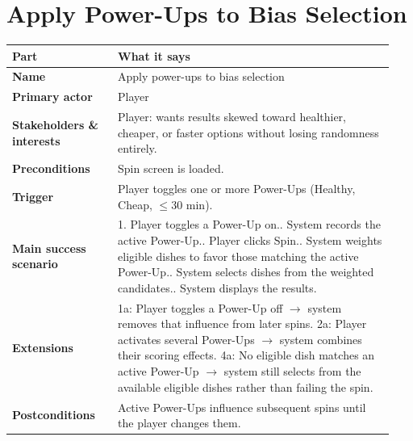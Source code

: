 \documentclass[11pt,twocolumn]{article}
\newcommand{\ucheader}{%
\textbf{Part} & \textbf{What it says} \\
\hline
\endhead
\hline
\endfoot
}
\begin{document}
\section{Apply Power-Ups to Bias Selection}
{\footnotesize
\begin{longtable}{@{}p{0.26\linewidth}p{0.68\linewidth}@{}}
\hline
\ucheader
\textbf{Name} & Apply power-ups to bias selection \\
\hline
\textbf{Primary actor} & Player \\
\hline
\textbf{Stakeholders \& interests} & Player: wants results skewed toward healthier, cheaper, or faster options without losing randomness entirely. \\
\hline
\textbf{Preconditions} & Spin screen is loaded. \\
\hline
\textbf{Trigger} & Player toggles one or more Power-Ups (Healthy, Cheap, $\leq$30 min). \\
\hline
\textbf{Main success scenario} & 1. Player toggles a Power-Up on.\newline
2. System records the active Power-Up.\newline
3. Player clicks Spin.\newline
4. System weights eligible dishes to favor those matching the active Power-Up.\newline
5. System selects dishes from the weighted candidates.\newline
6. System displays the results. \\
\hline
\textbf{Extensions} & 1a: Player toggles a Power-Up off $\rightarrow$ system removes that influence from later spins.\newline
2a: Player activates several Power-Ups $\rightarrow$ system combines their scoring effects.\newline
4a: No eligible dish matches an active Power-Up $\rightarrow$ system still selects from the available eligible dishes rather than failing the spin. \\
\hline
\textbf{Postconditions} & Active Power-Ups influence subsequent spins until the player changes them. \\
\hline
\end{longtable}
}
\end{document}
